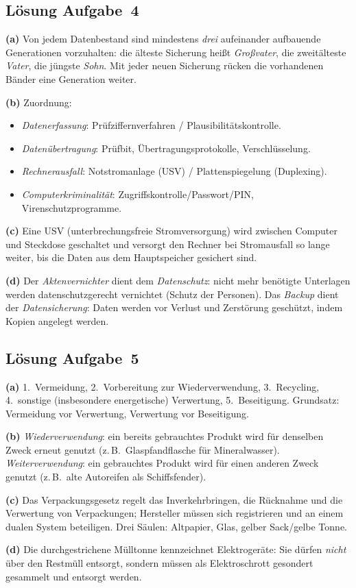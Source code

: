 \documentclass[11pt, a4paper]{article}
\begin{document}
\subsection*{Lösung Aufgabe~4}
\begin{loesung}
\textbf{(a)} Von jedem Datenbestand sind mindestens \emph{drei} aufeinander aufbauende
Generationen vorzuhalten: die älteste Sicherung heißt \emph{Großvater}, die zweitälteste
\emph{Vater}, die jüngste \emph{Sohn}. Mit jeder neuen Sicherung rücken die vorhandenen
Bänder eine Generation weiter.

\textbf{(b)} Zuordnung:
\begin{itemize}[itemsep=0pt]
  \item \emph{Datenerfassung}: Prüfziffernverfahren / Plausibilitätskontrolle.
  \item \emph{Datenübertragung}: Prüfbit, Übertragungsprotokolle, Verschlüsselung.
  \item \emph{Rechnerausfall}: Notstromanlage (USV) / Plattenspiegelung (Duplexing).
  \item \emph{Computerkriminalität}: Zugriffskontrolle/Passwort/PIN, Virenschutzprogramme.
\end{itemize}

\textbf{(c)} Eine USV (unterbrechungsfreie Stromversorgung) wird zwischen Computer und
Steckdose geschaltet und versorgt den Rechner bei Stromausfall so lange weiter, bis die
Daten aus dem Hauptspeicher gesichert sind.

\textbf{(d)} Der \emph{Aktenvernichter} dient dem \emph{Datenschutz}: nicht mehr
benötigte Unterlagen werden datenschutzgerecht vernichtet (Schutz der Personen). Das
\emph{Backup} dient der \emph{Datensicherung}: Daten werden vor Verlust und Zerstörung
geschützt, indem Kopien angelegt werden.
\end{loesung}

\subsection*{Lösung Aufgabe~5}
\begin{loesung}
\textbf{(a)} 1.~Vermeidung, 2.~Vorbereitung zur Wiederverwendung, 3.~Recycling,
4.~sonstige (insbesondere energetische) Verwertung, 5.~Beseitigung. Grundsatz:
Vermeidung vor Verwertung, Verwertung vor Beseitigung.

\textbf{(b)} \emph{Wiederverwendung}: ein bereits gebrauchtes Produkt wird für denselben
Zweck erneut genutzt (z.\,B.\ Glaspfandflasche für Mineralwasser). \emph{Weiterverwendung}:
ein gebrauchtes Produkt wird für einen anderen Zweck genutzt (z.\,B.\ alte Autoreifen als
Schiffsfender).

\textbf{(c)} Das Verpackungsgesetz regelt das Inverkehrbringen, die Rücknahme und die
Verwertung von Verpackungen; Hersteller müssen sich registrieren und an einem dualen
System beteiligen. Drei Säulen: Altpapier, Glas, gelber Sack/gelbe Tonne.

\textbf{(d)} Die durchgestrichene Mülltonne kennzeichnet Elektrogeräte: Sie dürfen
\emph{nicht} über den Restmüll entsorgt, sondern müssen als Elektroschrott gesondert
gesammelt und entsorgt werden.
\end{loesung}
\end{document}
